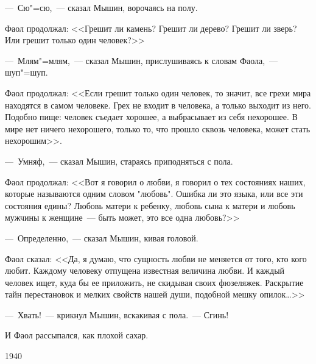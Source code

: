 ---~Сю"=сю,~--- сказал Мышин, ворочаясь на полу.

Фаол продолжал: <<Грешит ли камень? Грешит ли дерево? Грешит ли зверь? Или грешит только один человек?>>

---~Млям"=млям,~--- сказал Мышин, прислушиваясь к словам Фаола,~--- шуп"=шуп.

Фаол продолжал: <<Если грешит только один человек, то значит, все грехи мира находятся в самом человеке. Грех не входит в человека, а только выходит из него. Подобно пище: человек съедает хорошее, а выбрасывает из себя нехорошее. В мире нет ничего нехорошего, только то, что прошло сквозь человека, может стать нехорошим>>.

---~Умняф,~--- сказал Мышин, стараясь приподняться с пола.

Фаол продолжал: <<Вот я говорил о любви, я говорил о тех состояниях наших, которые называются одним словом "любовь". Ошибка ли это языка, или все эти состояния едины? Любовь матери к ребенку, любовь сына к матери и любовь мужчины к женщине~--- быть может, это все одна любовь?>>

---~Определенно,~--- сказал Мышин, кивая головой.

Фаол сказал: <<Да, я думаю, что сущность любви не меняется от того, кто кого любит. Каждому человеку отпущена известная величина любви. И каждый человек ищет, куда бы ее приложить, не скидывая своих фюзеляжек. Раскрытие тайн перестановок и мелких свойств нашей души, подобной мешку опилок\dots>>

---~Хвать!~--- крикнул Мышин, вскакивая с пола.~--- Сгинь!

И Фаол рассыпался, как плохой сахар.

\begin{flushright}
1940
\end{flushright}
